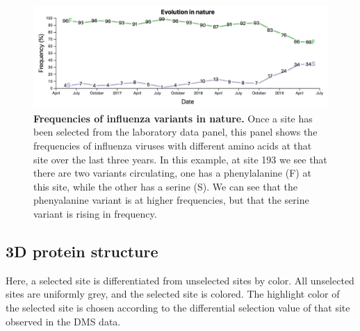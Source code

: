 \documentclass[sigchi]{acmart}
\begin{document}
\begin{figure}[H]
	\includegraphics[width=1.0\textwidth]{frequencies-panel.png}
	\caption{\textbf{Frequencies of influenza variants in nature.}
  Once a site has been selected from the laboratory data panel, this panel shows the frequencies of influenza viruses with different amino acids at that site over the last three years. In this example, at site 193 we see that there are two variants circulating, one has a phenylalanine (F) at this site, while the other has a serine (S). We can see that the phenyalanine variant is at higher frequencies, but that the serine variant is rising in frequency.
  }
	\label{frequencies-panel}
\end{figure}

\subsection{3D protein structure}
Here, a selected site is differentiated from unselected sites by color. All unselected sites are uniformly grey, and the selected site is colored. The highlight color of the selected site is chosen according to the differential selection value of that site observed in the DMS data.
\end{document}
